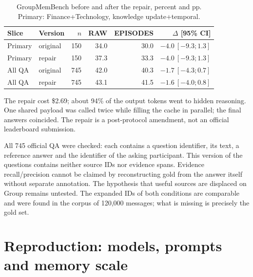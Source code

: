 \documentclass[11pt,a4paper]{article}
\begin{document}
\begin{table}[ht]
\centering\small
\begin{tabular}{llrrrr}
\toprule
Slice & Version & $n$ & RAW & EPISODES & $\Delta$ [95\% CI]\\
\midrule
Primary & original & 150 & 34.0 & 30.0 & $-4.0\ [-9.3;1.3]$\\
Primary & repair & 150 & 37.3 & 33.3 & $-4.0\ [-9.3;1.3]$\\
All QA & original & 745 & 42.0 & 40.3 & $-1.7\ [-4.3;0.7]$\\
All QA & repair & 745 & 43.1 & 41.5 & $-1.6\ [-4.0;0.8]$\\
\bottomrule
\end{tabular}
\caption{GroupMemBench before and after the repair, percent and pp. Primary:
Finance+Technology, knowledge update+temporal.}
\end{table}

The repair cost \$2.69; about 94\% of the output tokens went to hidden reasoning. One
shared payload was called twice while filling the cache in parallel; the final answers
coincided. The repair is a post-protocol amendment, not an official leaderboard
submission.

All 745 official QA were checked: each contains a question identifier, its text, a
reference answer and the identifier of the asking participant. This version of the
questions contains neither source IDs nor evidence spans. Evidence recall/precision
cannot be claimed by reconstructing gold from the answer itself without separate
annotation. The hypothesis that useful sources are displaced on Group remains untested.
The expanded IDs of both conditions are comparable and were found in the corpus of
120,000 messages; what is missing is precisely the gold set.

\section{Reproduction: models, prompts and memory scale}
\label{app:reproduce}
\end{document}
